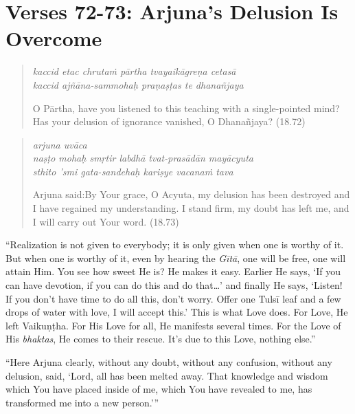 \documentclass[12pt, twoside, openright]{memoir}
\begin{document}
\newpage
\section{Verses 72-73: Arjuna's Delusion Is Overcome}\label{sec-verses-72-73-arjuna-s-delusion-is-overcome}


\par
\begin{verse}
\textit{kaccid etac chrutaṁ pārtha tvayaikāgreṇa cetasā} \\
\textit{kaccid ajñāna-sammohaḥ praṇaṣṭas te dhanañjaya}

\noindent O Pārtha, have you listened to this teaching with a single-pointed mind? Has your delusion of ignorance vanished, O Dhanañjaya? (18.72)
\end{verse}
\par



\par
\begin{verse}
\textit{arjuna uvāca} \\
\textit{naṣṭo mohaḥ smṛtir labdhā tvat-prasādān mayācyuta} \\
\textit{sthito ’smi gata-sandehaḥ kariṣye vacanaṁ tava}

\noindent \quad Arjuna said:\linebreak By Your grace, O Acyuta, my delusion has been destroyed and I have regained my understanding. I stand firm, my doubt has left me, and I will carry out Your word. (18.73)
\end{verse}
\par


\enquote{Realization is not given to everybody; it is only given when one is worthy of it. But when one is worthy of it, even by hearing the \textit{Gītā}, one will be free, one will attain Him. You see how sweet He is? He makes it easy. Earlier He says, \enquote{If you can have devotion, if you can do this and do that\ldots} and finally He says, \enquote{Listen! If you don’t have time to do all this, don’t worry. Offer one Tulsī leaf and a few drops of water with love, I will accept this.} This is what Love does. For Love, He left Vaikuṇṭha. For His Love for all, He manifests several times. For the Love of His \textit{bhaktas}, He comes to their rescue. It’s due to this Love, nothing else.}

\enquote{Here Arjuna clearly, without any doubt, without any confusion, without any delusion, said, \enquote{Lord, all has been melted away. That knowledge and wisdom which You have placed inside of me, which You have revealed to me, has transformed me into a new person.}}
\end{document}

